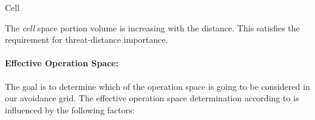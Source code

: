 \begin{definition}{Cell}
\end{definition}

\begin{note}
    The \emph{cell} space portion volume is increasing with the distance. This satisfies the requirement for threat-distance importance.  
\end{note}

\paragraph{Effective Operation Space:} The goal is to determine which of the operation space is going to be considered in our avoidance grid.  The effective operation space determination according to \cite{zaiane2002clustering} is influenced by the following factors:

